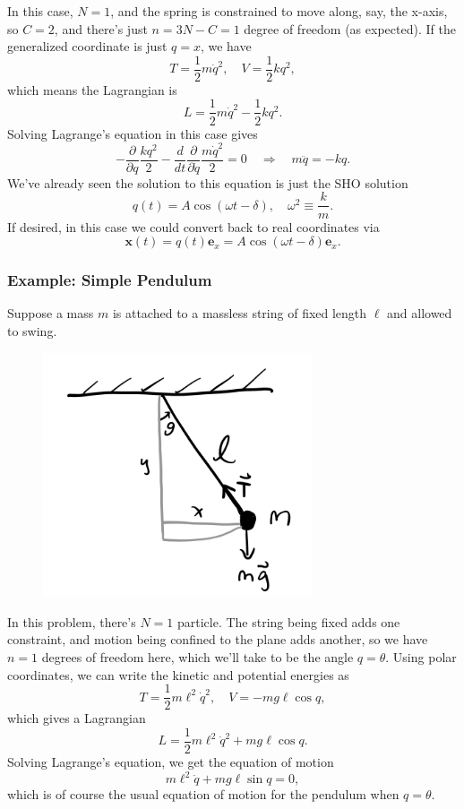 \documentclass[
  letterpaper,
  DIV=11,
  numbers=noendperiod]{scrreprt}
\begin{document}
In this case, \(N = 1\), and the spring is constrained to move along,
say, the x-axis, so \(C=2\), and there's just \(n=3N-C=1\) degree of
freedom (as expected). If the generalized coordinate is just \(q=x\), we
have \[
T = \frac{1}{2} m \dot q^2, \quad V = \frac{1}{2}kq^2,
\] which means the Lagrangian is \[
L = \frac{1}{2} m \dot q^2 - \frac{1}{2}kq^2.
\] Solving Lagrange's equation in this case gives \[
-\frac{\partial}{\partial q} \frac{k q^2}{2} - \frac{d}{dt} \frac{\partial}{\partial \dot q} \frac{m\dot q^2}{2} = 0 \quad \Rightarrow \quad m\ddot q = -k q.
\] We've already seen the solution to this equation is just the SHO
solution \[
q(t) = A\cos(\omega t - \delta), \quad \omega^2 \equiv \frac{k}{m}.
\] If desired, in this case we could convert back to real coordinates
via \[
\mathbf{x}(t) = q(t) \mathbf{e}_x = A\cos(\omega t - \delta)\mathbf{e}_x.
\]

\hypertarget{example-simple-pendulum-1}{%
\subsubsection{Example: Simple
Pendulum}\label{example-simple-pendulum-1}}

Suppose a mass \(m\) is attached to a massless string of fixed length
\(\ell\) and allowed to swing.

\begin{figure}

{\centering \includegraphics[width=3.125in,height=\textheight]{classical-mechanics/./resources/image-20230212040128210.png}

}

\end{figure}

In this problem, there's \(N=1\) particle. The string being fixed adds
one constraint, and motion being confined to the plane adds another, so
we have \(n=1\) degrees of freedom here, which we'll take to be the
angle \(q=\theta\). Using polar coordinates, we can write the kinetic
and potential energies as \[
T = \frac{1}{2} m\ell^2 \dot q^2, \quad V = -mg\ell\cos q,
\] which gives a Lagrangian \[
L = \frac{1}{2} m\ell^2 \dot q^2 + mg\ell\cos q.
\] Solving Lagrange's equation, we get the equation of motion \[
m\ell^2 \ddot q + mg\ell\sin q = 0,
\] which is of course the usual equation of motion for the pendulum when
\(q=\theta\).
\end{document}

